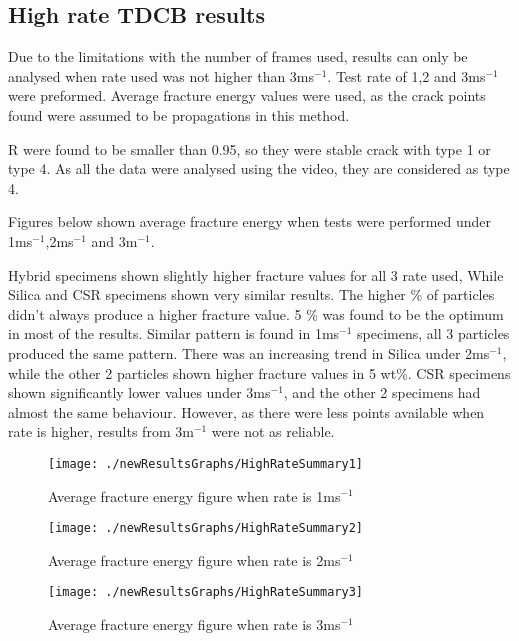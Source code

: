 \documentclass[numbers=noendperiod,chapterprefix=on]{icldt} %
\begin{document}
\subsection{High rate TDCB results}
Due to the limitations with the number of frames used, results can only be analysed when rate used was not higher than 3ms$^{-1}$. Test rate of 1,2 and 3ms$^{-1}$ were preformed. Average fracture energy values were used, as the crack points found were assumed to be propagations in this method. 

R were found to be smaller than 0.95, so they were stable crack with type 1 or type 4. As all the data were analysed using the video, they are considered as type 4.
  
Figures below shown average fracture energy when tests were performed under 1ms$^{-1}$,2ms$^{-1}$ and 3m$^{-1}$.

Hybrid specimens shown slightly higher fracture values for all 3 rate used, While Silica and CSR specimens shown very similar results. The higher \% of particles didn't always produce a higher fracture value. 5 \% was found to be the optimum in most of the results.  Similar pattern is found in 1ms$^{-1}$ specimens, all 3 particles produced the same pattern. There was an increasing trend in Silica under 2ms$^{-1}$, while the other 2 particles shown higher fracture values in 5 wt\%. CSR specimens shown significantly lower values under 3ms$^{-1}$, and the other 2 specimens had almost the same behaviour. However, as there were less points available when rate is higher, results from 3m$^{-1}$ were not as reliable.   

\begin{figure}[!htpb]
\centering
\texttt{[image: ./newResultsGraphs/HighRateSummary1]}
\caption{Average fracture energy figure when rate is 1ms$^{-1}$} %
\end{figure}
\FloatBarrier


\begin{figure}[!htpb]
\centering
\texttt{[image: ./newResultsGraphs/HighRateSummary2]}
\caption{Average fracture energy figure when rate is 2ms$^{-1}$} %
\end{figure}
\FloatBarrier


\begin{figure}[!htpb]
\centering
\texttt{[image: ./newResultsGraphs/HighRateSummary3]}
\caption{Average fracture energy figure when rate is 3ms$^{-1}$} %
\end{figure}
\FloatBarrier
\end{document}
